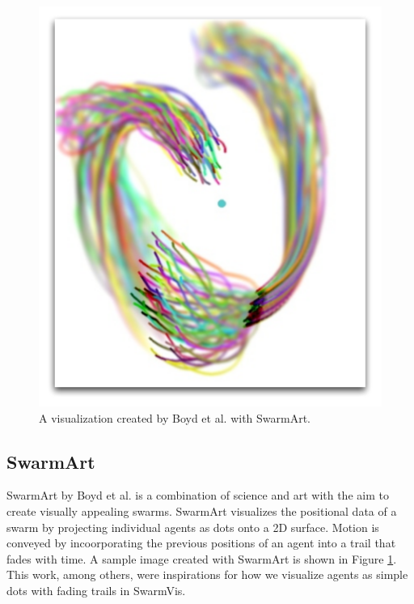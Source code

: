 \documentclass[conference]{IEEEtran}
\begin{document}
\begin{figure}
\centering
\includegraphics[scale=.333333]{images/SwarmArt.pdf}
\caption{A visualization created by Boyd et al. with SwarmArt\cite{Boyd}.}
\label{SwarmArt}
\end{figure}

\subsection{SwarmArt}
SwarmArt\cite{Boyd} by Boyd et al. is a combination of science and art with the aim to create visually appealing swarms.
SwarmArt visualizes the positional data of a swarm by projecting individual agents as dots onto a 2D surface.
Motion is conveyed by incoorporating the previous positions of an agent into a trail that fades with time.
A sample image created with SwarmArt is shown in Figure \ref{SwarmArt}.
This work, among others\cite{codeswarm:website}, were inspirations for how we visualize agents as simple dots with fading trails
in SwarmVis.
\end{document}
